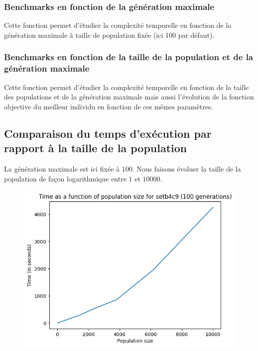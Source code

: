 \subsubsection{Benchmarks en fonction de la génération maximale}



Cette fonction permet d'étudier la complexité temporelle en fonction de la génération maximale à taille de population fixée (ici 100 par défaut).

\subsubsection{Benchmarks en fonction  de la taille de la population et de la génération maximale}



Cette fonction permet d'étudier la complexité temporelle en fonction de la taille des populations et de la génération maximale mais aussi l'évolution de la fonction objective du meilleur individu en fonction de ces mêmes paramètres.

\subsection{Comparaison du temps d'exécution par rapport à la taille de la population}

La génération maximale est ici fixée à $100$. Nous faisons évoluer la taille de la population de façon logarithmique entre $1$ et $10000$.

\begin{figure}[!h]
    \centering
    \includegraphics[]{report/Pictures/setb4c9_benchmarks_population.png}
\end{figure}

